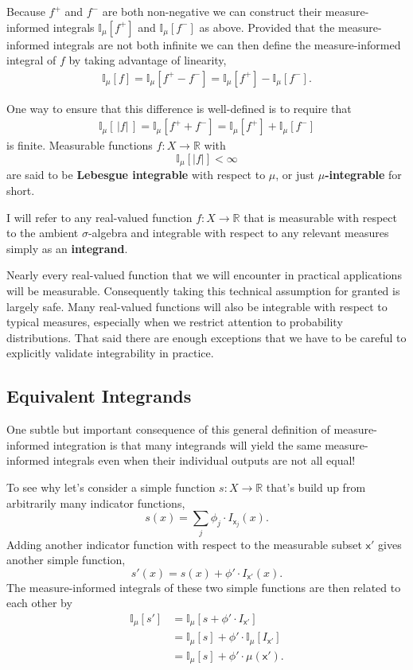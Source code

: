 \documentclass[
  letterpaper,
  DIV=11,
  numbers=noendperiod]{scrartcl}
\begin{document}
Because \(f^{+}\) and \(f^{-}\) are both non-negative we can construct
their measure-informed integrals \(\mathbb{I}_{\mu}[f^{+}]\) and
\(\mathbb{I}_{\mu}[f^{-}]\) as above. Provided that the measure-informed
integrals are not both infinite we can then define the measure-informed
integral of \(f\) by taking advantage of linearity, \begin{align*}
\mathbb{I}_{\mu}[f]
=
\mathbb{I}_{\mu}[f^{+} - f^{-}]
=
\mathbb{I}_{\mu}[f^{+}] - \mathbb{I}_{\mu}[f^{-}].
\end{align*}

One way to ensure that this difference is well-defined is to require
that \begin{align*}
\mathbb{I}_{\mu}[ \, | f | \, ]
=
\mathbb{I}_{\mu}[f^{+} + f^{-}]
=
\mathbb{I}_{\mu}[f^{+}] + \mathbb{I}_{\mu}[f^{-}]
\end{align*} is finite. Measurable functions
\(f : X \rightarrow \mathbb{R}\) with \[
\mathbb{I}_{\mu}[| f |] < \infty
\] are said to be \textbf{Lebesgue integrable} with respect to \(\mu\),
or just \textbf{\(\mu\)-integrable} for short.

I will refer to any real-valued function \(f: X \rightarrow \mathbb{R}\)
that is measurable with respect to the ambient \(\sigma\)-algebra and
integrable with respect to any relevant measures simply as an
\textbf{integrand}.

Nearly every real-valued function that we will encounter in practical
applications will be measurable. Consequently taking this technical
assumption for granted is largely safe. Many real-valued functions will
also be integrable with respect to typical measures, especially when we
restrict attention to probability distributions. That said there are
enough exceptions that we have to be careful to explicitly validate
integrability in practice.

\hypertarget{equivalent-integrands}{%
\subsection{Equivalent Integrands}\label{equivalent-integrands}}

One subtle but important consequence of this general definition of
measure-informed integration is that many integrands will yield the same
measure-informed integrals even when their individual outputs are not
all equal!

To see why let's consider a simple function
\(s: X \rightarrow \mathbb{R}\) that's build up from arbitrarily many
indicator functions, \[
s(x) = \sum_{j} \phi_{j} \cdot I_{\mathsf{x}_{j}}(x).
\] Adding another indicator function with respect to the measurable
subset \(\mathsf{x}'\) gives another simple function, \[
s'(x) = s(x) + \phi' \cdot I_{\mathsf{x}'}(x).
\] The measure-informed integrals of these two simple functions are then
related to each other by \begin{align*}
\mathbb{I}_{\mu}[s']
&=
\mathbb{I}_{\mu}[s + \phi' \cdot I_{\mathsf{x}'}]
\\
&=
\mathbb{I}_{\mu}[s] + \phi' \cdot \mathbb{I}_{\mu}[I_{\mathsf{x}'}]
\\
&=
\mathbb{I}_{\mu}[s] + \phi' \cdot \mu(\mathsf{x}').
\end{align*}
\end{document}
